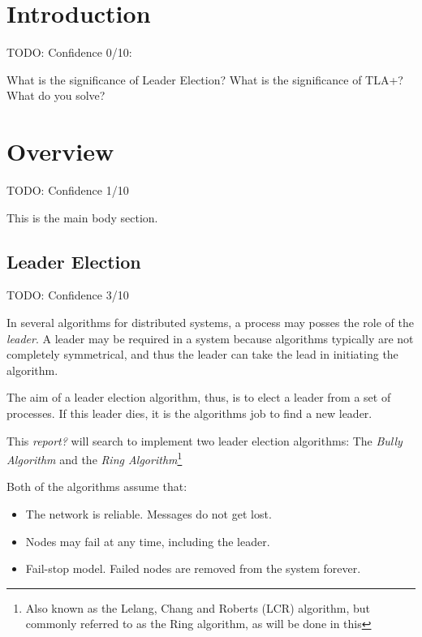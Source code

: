 \documentclass{report}
\begin{document}
\tableofcontents

\chapter{Introduction}
\begin{callout}
  TODO: Confidence 0/10:

  What is the significance of Leader Election? What is the significance of TLA+? What do you solve?
\end{callout}

\chapter{Overview}
\begin{callout}
TODO: Confidence 1/10
\end{callout}

This is the main body section.

\section{Leader Election}
\begin{callout}
TODO: Confidence 3/10
\end{callout}

In several algorithms for distributed systems, a process may posses the role of the \textit{leader}. A leader may be required in a system because algorithms typically are not completely symmetrical, and thus the leader can take the lead in initiating the algorithm. \cite{kshemkalyani2011distributed}

The aim of a leader election algorithm, thus, is to elect a leader from a set of processes. If this leader dies, it is the algorithms job to find a new leader.

This \textit{report?} will search to implement two leader election algorithms: The \textit{Bully Algorithm} and the \textit{Ring Algorithm}\footnote{Also known as the Lelang, Chang and Roberts (LCR) algorithm, but commonly referred to as the Ring algorithm, as will be done in this }

Both of the algorithms assume that:
\begin{itemize}
  \item The network is reliable. Messages do not get lost.
  \item Nodes may fail at any time, including the leader.
  \item Fail-stop model. Failed nodes are removed from the system forever.
\end{itemize}
\end{document}
